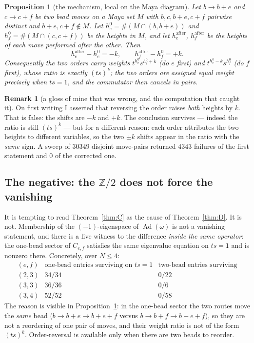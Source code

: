 \documentclass[11pt]{article}
\newtheorem{proposition}[theorem]{Proposition}
\theoremstyle{definition}
\newtheorem{remark}[theorem]{Remark}
\newcommand{\Z}{\mathbb{Z}}
\newcommand{\Ad}{\operatorname{Ad}}
\begin{document}
\begin{proposition}[the mechanism, local on the Maya diagram]\label{prop:routes}
Let $b\to b+e$ and $c\to c+f$ be two bead moves on a Maya set $M$ with
$b,c,b+e,c+f$ pairwise distinct and $b+e,c+f\notin M$.  Let $h_e^0=\#(M\cap(b,b+e))$
and $h_f^0=\#(M\cap(c,c+f))$ be the heights in $M$, and let $h_e^{\mathrm{after}}$,
$h_f^{\mathrm{after}}$ be the heights of each move performed \emph{after} the other.
Then
\[
  h_e^{\mathrm{after}}-h_e^{0}=-k,\qquad h_f^{\mathrm{after}}-h_f^{0}=+k .
\]
Consequently the two orders carry weights
$t^{h_e^{0}}s^{h_f^{0}+k}$ (do $e$ first) and $t^{h_e^{0}-k}s^{h_f^{0}}$ (do $f$
first), whose ratio is exactly $(ts)^{k}$; the two orders are assigned \emph{equal}
weight precisely when $ts=1$, and the commutator then cancels in pairs.
\end{proposition}

\begin{remark}[a gloss of mine that was wrong, and the computation that caught it]
On first writing I asserted that reversing the order raises \emph{both} heights by
$k$.  That is false: the shifts are $-k$ and $+k$.  The conclusion survives ---
indeed the ratio is still $(ts)^k$ --- but for a different reason: each order
attributes the two heights to different variables, so the two $\pm k$ shifts appear
in the ratio with the \emph{same} sign.  A sweep of $30349$ disjoint move-pairs
returned $4343$ failures of the first statement and $0$ of the corrected one.
\end{remark}

\subsection*{The negative: the $\Z/2$ does not force the vanishing}

It is tempting to read Theorem~\ref{thm:C} as the cause of Theorem~\ref{thm:D}.  It
is not.  Membership of the $(-1)$-eigenspace of $\Ad(\omega)$ is not a vanishing
statement, and there is a live witness to the difference \emph{inside the same
operator}: the one-bead sector of $C_{e,f}$ satisfies the same eigenvalue equation on
$ts=1$ and is nonzero there.  Concretely, over $N\le4$:
\[
\begin{array}{lcc}
 (e,f) & \text{one-bead entries surviving on }ts=1 & \text{two-bead entries surviving}\\\hline
 (2,3) & 34/34 & 0/22\\
 (3,3) & 36/36 & 0/6\\
 (3,4) & 52/52 & 0/58
\end{array}
\]
The reason is visible in Proposition~\ref{prop:routes}: in the one-bead sector the
two routes move the \emph{same} bead ($b\to b+e\to b+e+f$ versus
$b\to b+f\to b+e+f$), so they are not a reordering of one pair of moves, and their
weight ratio is not of the form $(ts)^k$.  Order-reversal is available only when
there are two beads to reorder.
\end{document}
